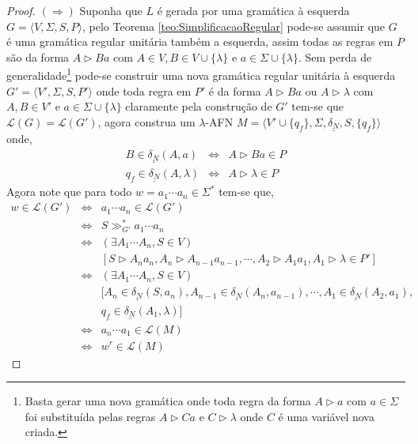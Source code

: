 \begin{proof}
	$(\Rightarrow)$ Suponha que $L$ é gerada por uma gramática à esquerda $G = \langle V, \Sigma, S, P \rangle$, pelo Teorema \ref{teo:SimplificacaoRegular} pode-se assumir que $G$ é uma gramática regular unitária também a esquerda, assim todas as regras em $P$ são da forma $A \rhd Ba$ com $A \in V, B \in V \cup \{\lambda\}$ e $a \in \Sigma \cup \{\lambda\}$. Sem perda de generalidade\footnote{Basta gerar uma nova gramática onde toda regra da forma $A \rhd a$ com $a \in \Sigma$ foi substituída pelas regras $A \rhd Ca$ e $C \rhd \lambda$ onde $C$ é uma variável nova criada.} pode-se construir uma nova gramática regular unitária à esquerda $G' = \langle V', \Sigma, S, P'\rangle$ onde toda regra em $P'$ é da forma $A \rhd Ba$ ou $A \rhd \lambda$ com $A, B \in V'$ e $a \in \Sigma \cup \{\lambda\}$ claramente pela construção de $G'$ tem-se que $\mathcal{L}(G) = \mathcal{L}(G')$, agora construa um $\lambda$-AFN $M = \langle V' \cup \{q_f\}, \Sigma, \underline{\delta_N}, S, \{q_f\} \rangle$ onde, 
	\begin{eqnarray*}
		B \in \underline{\delta_N}(A, a) & \Longleftrightarrow & A \rhd Ba \in P\\
		q_f \in \underline{\delta_N}(A, \lambda)& \Longleftrightarrow & A \rhd \lambda \in P
	\end{eqnarray*} 
	Agora note que para todo $w = a_1\cdots a_n \in \Sigma^*$ tem-se que,
	\begin{eqnarray*}
		w \in \mathcal{L}(G') & \Longleftrightarrow &  a_1\cdots a_n \in \mathcal{L}(G')\\
		& \Longleftrightarrow & S \gg_{G'}^* a_1\cdots a_n\\
		& \Longleftrightarrow & (\exists A_1 \cdots A_n, S \in V)\\
		& & [S \rhd A_na_n, A_n \rhd A_{n-1}a_{n-1}, \cdots, A_{2} \rhd A_1a_1, A_1 \rhd \lambda \in P']\\
		& \Longleftrightarrow & (\exists A_1 \cdots A_n, S \in V)\\
		& & [A_n \in \underline{\delta_N}(S, a_n), A_{n-1} \in \underline{\delta_N}(A_n, a_{n-1}), \cdots,  A_{1} \in \underline{\delta_N}(A_2, a_{1}), \\
		& &  q_f \in \underline{\delta_N}(A_1, \lambda)]\\
		& \Longleftrightarrow & a_n\cdots a_1 \in \mathcal{L}(M)\\
		& \Longleftrightarrow & w^r \in \mathcal{L}(M)
	\end{eqnarray*}

\end{proof}

